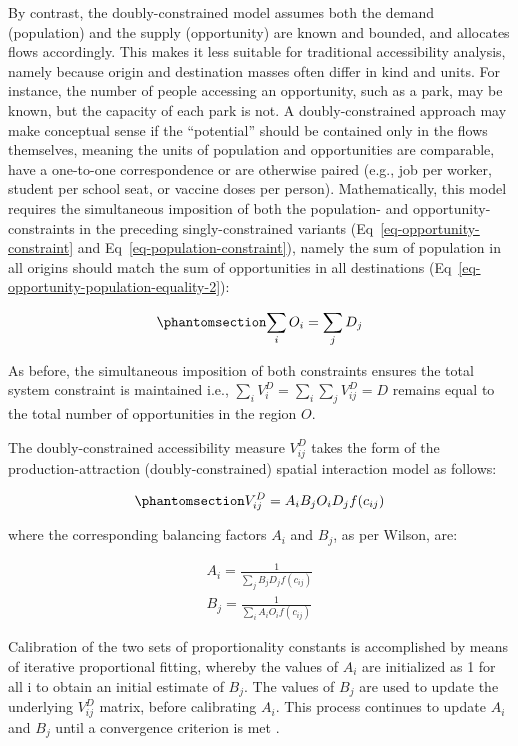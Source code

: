 \documentclass[
  10pt,
  letterpaper,
]{article}
\begin{document}
By contrast, the doubly-constrained model assumes both the demand
(population) and the supply (opportunity) are known and bounded, and
allocates flows accordingly. This makes it less suitable for traditional
accessibility analysis, namely because origin and destination masses
often differ in kind and units. For instance, the number of people
accessing an opportunity, such as a park, may be known, but the capacity
of each park is not. A doubly-constrained approach may make conceptual
sense if the ``potential'' should be contained only in the flows
themselves, meaning the units of population and opportunities are
comparable, have a one-to-one correspondence or are otherwise paired
(e.g., job per worker, student per school seat, or vaccine doses per
person). Mathematically, this model requires the simultaneous imposition
of both the population- and opportunity- constraints in the preceding
singly-constrained variants (Eq~\ref{eq-opportunity-constraint} and
Eq~\ref{eq-population-constraint}), namely the sum of population in all
origins should match the sum of opportunities in all destinations
(Eq~\ref{eq-opportunity-population-equality-2}):

\begin{equation}\phantomsection\label{eq-opportunity-population-equality-2}{
\sum_i O_i = \sum_j D_j
}\end{equation}

As before, the simultaneous imposition of both constraints ensures the
total system constraint is maintained i.e.,
\(\sum_i V^D_{i} = \sum_i\sum_j  V^D_{ij} = D\) remains equal to the
total number of opportunities in the region \(O\).

The doubly-constrained accessibility measure \(V_{ij}^D\) takes the form
of the production-attraction (doubly-constrained) spatial interaction
model as follows:

\begin{equation}\phantomsection\label{eq-doubly-constrained-accessibility}{
V_{ij}^D = A_i B_j O_i D_j f(c_{ij})
}\end{equation}

\noindent where the corresponding balancing factors \(A_i\) and \(B_j\),
as per Wilson, are:

\[
\begin{array}{l}
A_i = \frac{1}{\sum_j B_j D_j f(c_{ij})}\\
B_j = \frac{1}{\sum_i A_i O_i f(c_{ij})}
\end{array}
\]

Calibration of the two sets of proportionality constants is accomplished
by means of iterative proportional fitting, whereby the values of
\(A_i\) are initialized as 1 for all i to obtain an initial estimate of
\(B_j\). The values of \(B_j\) are used to update the underlying
\(V_{ij}^D\) matrix, before calibrating \(A_i\). This process continues
to update \(A_i\) and \(B_j\) until a convergence criterion is met
\citep[see][p.~193-195]{ortuzar_2011_modelling}.
\end{document}
